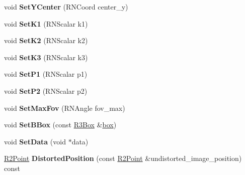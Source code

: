 \begin{DoxyCompactItemize}
\item 
void {\bfseries Set\+Y\+Center} (R\+N\+Coord center\+\_\+y)\hypertarget{class_g_s_v_camera_a32eafb2ed47433225b5398d7d73b864e}{}\label{class_g_s_v_camera_a32eafb2ed47433225b5398d7d73b864e}

\item 
void {\bfseries Set\+K1} (R\+N\+Scalar k1)\hypertarget{class_g_s_v_camera_a46b002318ef2d5f024111b667c945547}{}\label{class_g_s_v_camera_a46b002318ef2d5f024111b667c945547}

\item 
void {\bfseries Set\+K2} (R\+N\+Scalar k2)\hypertarget{class_g_s_v_camera_ae79f975d33b23e16a7f92cee67651b11}{}\label{class_g_s_v_camera_ae79f975d33b23e16a7f92cee67651b11}

\item 
void {\bfseries Set\+K3} (R\+N\+Scalar k3)\hypertarget{class_g_s_v_camera_a345e882ed75b6f26b974d9bb32c0b36a}{}\label{class_g_s_v_camera_a345e882ed75b6f26b974d9bb32c0b36a}

\item 
void {\bfseries Set\+P1} (R\+N\+Scalar p1)\hypertarget{class_g_s_v_camera_a64b8c4abc65be8a597706e83e8032b65}{}\label{class_g_s_v_camera_a64b8c4abc65be8a597706e83e8032b65}

\item 
void {\bfseries Set\+P2} (R\+N\+Scalar p2)\hypertarget{class_g_s_v_camera_a6f8f6ade3340dda9cc6545910934d7ea}{}\label{class_g_s_v_camera_a6f8f6ade3340dda9cc6545910934d7ea}

\item 
void {\bfseries Set\+Max\+Fov} (R\+N\+Angle fov\+\_\+max)\hypertarget{class_g_s_v_camera_a0b0ead45aabc2f4c65bc3ea1c96b039d}{}\label{class_g_s_v_camera_a0b0ead45aabc2f4c65bc3ea1c96b039d}

\item 
void {\bfseries Set\+B\+Box} (const \hyperlink{class_r3_box}{R3\+Box} \&\hyperlink{structbox}{box})\hypertarget{class_g_s_v_camera_a72af0931c0f1acf2ee44f770c92aa479}{}\label{class_g_s_v_camera_a72af0931c0f1acf2ee44f770c92aa479}

\item 
void {\bfseries Set\+Data} (void $\ast$data)\hypertarget{class_g_s_v_camera_af4fea666ee86b3b71c09b3f9906958d5}{}\label{class_g_s_v_camera_af4fea666ee86b3b71c09b3f9906958d5}

\item 
\hyperlink{class_r2_point}{R2\+Point} {\bfseries Distorted\+Position} (const \hyperlink{class_r2_point}{R2\+Point} \&undistorted\+\_\+image\+\_\+position) const \hypertarget{class_g_s_v_camera_ae5494c8c56d13405c6c8b1fe2ac2ecc0}{}\label{class_g_s_v_camera_ae5494c8c56d13405c6c8b1fe2ac2ecc0}


\end{DoxyCompactItemize}
